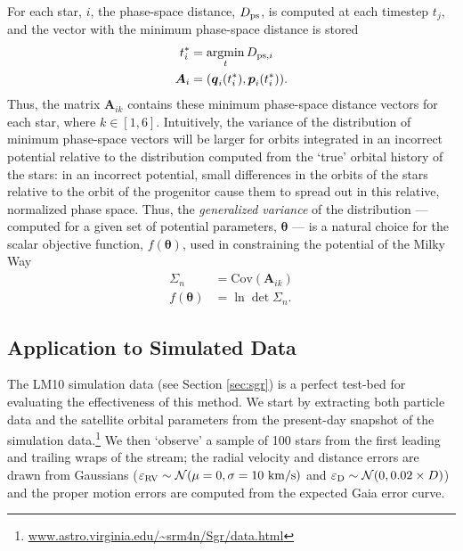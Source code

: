 \documentclass{emulateapj}
\newcommand{\bs}{\boldsymbol}
\newcommand{\argmin}{\operatornamewithlimits{argmin}}
\begin{document}
For each star, $i$,
the phase-space distance, $D_{\rm ps}$, is computed at each timestep
$t_{j}$, and the vector with the minimum phase-space distance is stored
\begin{align}
  t^*_{i} &= \argmin_{t} D_{{\rm ps},i}\\
  \bs{A}_{i} &= (\bs{q}_{i}(t^*_{i}),\bs{p}_{i}(t^*_{i})).
\end{align}
Thus, the matrix $\bs{A}_{ik}$ contains these minimum phase-space
distance vectors for each star, where $k\in[1,6]$. Intuitively, the
variance of the distribution of minimum phase-space vectors will be
larger for orbits integrated in an incorrect potential relative to the
distribution computed from the `true' orbital history of the stars: in
an incorrect potential, small differences in the orbits of the stars
relative to the orbit of the progenitor cause them to spread out in
this relative, normalized phase space. Thus, the \emph{generalized
  variance} of the distribution --- computed for a given set of
potential parameters, $\bs{\theta}$ --- is a natural choice for the
scalar objective function, $f(\bs{\theta})$, used in constraining the potential of the
Milky Way
\begin{align}
  \Sigma_n &= \mathrm{Cov}( \bs{A}_{ik}) \\
  f(\bs{\theta}) &= \ln \det \Sigma_n.
\end{align}


\subsection{Application to Simulated Data} \label{sec:results}
The LM10 simulation data (see Section \ref{sec:sgr}) is a perfect
test-bed for evaluating the effectiveness of this method. We start by
extracting both particle data and the satellite orbital parameters
from the present-day snapshot of the simulation
data.\footnote{\url{www.astro.virginia.edu/~srm4n/Sgr/data.html}} We
then `observe' a sample of 100 stars from the first leading and
trailing wraps of the stream; the radial velocity and distance errors are drawn 
from Gaussians ($\varepsilon_{\rm RV} \sim \mathcal{N}(\mu=0,\sigma=10~{\rm
  km/s})$ and $\varepsilon_{\rm D} \sim \mathcal{N}(0,0.02\times
D)$) and the proper motion errors are computed from the expected Gaia error curve. 
\end{document}
